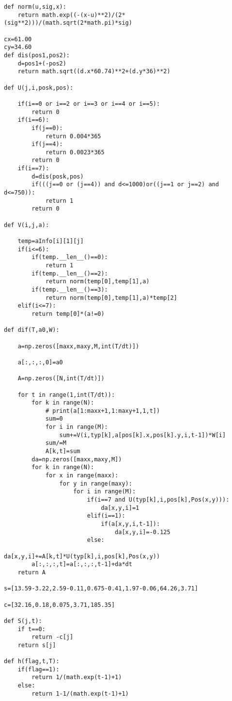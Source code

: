 \documentclass[./main.tex]{subfiles}
\begin{document}
\begin{spacing}
\begin{lstlisting}
def norm(u,sig,x):
    return math.exp((-(x-u)**2)/(2*(sig**2)))/(math.sqrt(2*math.pi)*sig)

cx=61.00
cy=34.60
def dis(pos1,pos2):
    d=pos1+(-pos2)
    return math.sqrt((d.x*60.74)**2+(d.y*36)**2)

def U(j,i,posk,pos):

    if(i==0 or i==2 or i==3 or i==4 or i==5):
        return 0
    if(i==6):
        if(j==0):
            return 0.004*365
        if(j==4):
            return 0.0023*365
        return 0
    if(i==7):
        d=dis(posk,pos)
        if(((j==0 or (j==4)) and d<=1000)or((j==1 or j==2) and d<=750)):
            return 1
        return 0

def V(i,j,a):

    temp=aInfo[i][1][j]
    if(i<=6):
        if(temp.__len__()==0):
            return 1
        if(temp.__len__()==2):
            return norm(temp[0],temp[1],a)
        if(temp.__len__()==3):
            return norm(temp[0],temp[1],a)*temp[2]
    elif(i<=7):
        return temp[0]*(a!=0)

def dif(T,a0,W):

    a=np.zeros([maxx,maxy,M,int(T/dt)])

    a[:,:,:,0]=a0

    A=np.zeros([N,int(T/dt)])

    for t in range(1,int(T/dt)):
        for k in range(N):
            # print(a[1:maxx+1,1:maxy+1,1,t])
            sum=0
            for i in range(M):
                sum+=V(i,typ[k],a[pos[k].x,pos[k].y,i,t-1])*W[i]
            sum/=M
            A[k,t]=sum
        da=np.zeros([maxx,maxy,M])
        for k in range(N):
            for x in range(maxx):
                for y in range(maxy):
                    for i in range(M):
                        if(i==7 and U(typ[k],i,pos[k],Pos(x,y))):
                            da[x,y,i]=1
                        elif(i==1):
                            if(a[x,y,i,t-1]):
                                da[x,y,i]=-0.125
                        else:
                            da[x,y,i]+=A[k,t]*U(typ[k],i,pos[k],Pos(x,y))
        a[:,:,:,t]=a[:,:,:,t-1]+da*dt
    return A

s=[13.59-3.22,2.59-0.11,0.675-0.41,1.97-0.06,64.26,3.71]

c=[32.16,0.18,0.075,3.71,185.35]

def S(j,t):
    if t==0:
        return -c[j]
    return s[j]

def h(flag,t,T):
    if(flag==1):
        return 1/(math.exp(t-1)+1)
    else:
        return 1-1/(math.exp(t-1)+1)


\end{lstlisting}
\end{spacing}
\end{document}
